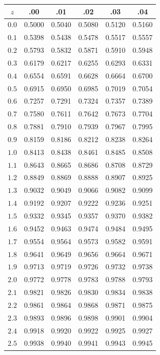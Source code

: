 \begin{center}
\small
\begin{tabular}{c|ccccc}
\toprule
$z$ & .00 & .01 & .02 & .03 & .04 \\
\midrule
$0.0$ & 0.5000 & 0.5040 & 0.5080 & 0.5120 & 0.5160 \\
$0.1$ & 0.5398 & 0.5438 & 0.5478 & 0.5517 & 0.5557 \\
$0.2$ & 0.5793 & 0.5832 & 0.5871 & 0.5910 & 0.5948 \\
$0.3$ & 0.6179 & 0.6217 & 0.6255 & 0.6293 & 0.6331 \\
$0.4$ & 0.6554 & 0.6591 & 0.6628 & 0.6664 & 0.6700 \\
$0.5$ & 0.6915 & 0.6950 & 0.6985 & 0.7019 & 0.7054 \\
$0.6$ & 0.7257 & 0.7291 & 0.7324 & 0.7357 & 0.7389 \\
$0.7$ & 0.7580 & 0.7611 & 0.7642 & 0.7673 & 0.7704 \\
$0.8$ & 0.7881 & 0.7910 & 0.7939 & 0.7967 & 0.7995 \\
$0.9$ & 0.8159 & 0.8186 & 0.8212 & 0.8238 & 0.8264 \\
$1.0$ & 0.8413 & 0.8438 & 0.8461 & 0.8485 & 0.8508 \\
$1.1$ & 0.8643 & 0.8665 & 0.8686 & 0.8708 & 0.8729 \\
$1.2$ & 0.8849 & 0.8869 & 0.8888 & 0.8907 & 0.8925 \\
$1.3$ & 0.9032 & 0.9049 & 0.9066 & 0.9082 & 0.9099 \\
$1.4$ & 0.9192 & 0.9207 & 0.9222 & 0.9236 & 0.9251 \\
$1.5$ & 0.9332 & 0.9345 & 0.9357 & 0.9370 & 0.9382 \\
$1.6$ & 0.9452 & 0.9463 & 0.9474 & 0.9484 & 0.9495 \\
$1.7$ & 0.9554 & 0.9564 & 0.9573 & 0.9582 & 0.9591 \\
$1.8$ & 0.9641 & 0.9649 & 0.9656 & 0.9664 & 0.9671 \\
$1.9$ & 0.9713 & 0.9719 & 0.9726 & 0.9732 & 0.9738 \\
$2.0$ & 0.9772 & 0.9778 & 0.9783 & 0.9788 & 0.9793 \\
$2.1$ & 0.9821 & 0.9826 & 0.9830 & 0.9834 & 0.9838 \\
$2.2$ & 0.9861 & 0.9864 & 0.9868 & 0.9871 & 0.9875 \\
$2.3$ & 0.9893 & 0.9896 & 0.9898 & 0.9901 & 0.9904 \\
$2.4$ & 0.9918 & 0.9920 & 0.9922 & 0.9925 & 0.9927 \\
$2.5$ & 0.9938 & 0.9940 & 0.9941 & 0.9943 & 0.9945 \\

\end{tabular}
\end{center}
